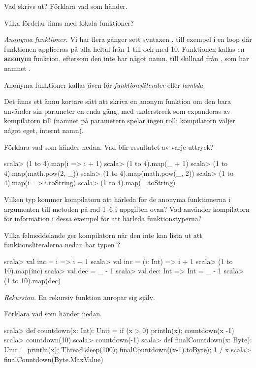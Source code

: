 \Subtask Vad skrivs ut? Förklara vad som händer.

\Subtask\Pen Vilka fördelar finns med lokala funktioner?


\Task \emph{Anonyma funktioner.} Vi har flera gånger sett syntaxen , till exempel i en loop  där funktionen  appliceras på alla heltal från 1 till och med 10. Funktionen  kallas en \textbf{anonym} funktion, eftersom den inte har något namn, till skillnad från , som har namnet .

Anonyma funktioner kallas även för \emph{funktionsliteraler} eller \emph{lambda}.

Det finns ett ännu kortare sätt att skriva en anonym funktion om den bara använder sin parameter en enda gång, med understreck  som expanderas av kompilatorn till  (namnet på parametern spelar ingen roll; kompilatorn väljer något eget, internt namn).

\Subtask Förklara vad som händer nedan. Vad blir resultatet av varje uttryck?

\begin{REPL}
scala> (1 to 4).map(i => i + 1)
scala> (1 to 4).map(_ + 1)
scala> (1 to 4).map(math.pow(2, _))
scala> (1 to 4).map(math.pow(_, 2))
scala> (1 to 4).map(i => i.toString)
scala> (1 to 4).map(_.toString)
\end{REPL}

\Subtask\Pen Vilken typ kommer kompilatorn att härleda för de anonyma funktionerna i argumenten till metoden  på rad 1--6 i uppgiften ovan? Vad använder kompilatorn för information i dessa exempel för att härleda funktionstyperna?

\Subtask\Pen Vilka felmeddelande ger kompilatorn när den inte kan lista ut att funktionsliteralerna nedan har typen ?

\begin{REPL}
scala> val inc = i => i + 1
scala> val inc = (i: Int) => i + 1
scala> (1 to 10).map(inc)
scala> val dec = _ - 1
scala> val dec: Int => Int = _ - 1
scala> (1 to 10).map(dec)
\end{REPL}



\Task \emph{Rekursion.} En rekursiv funktion anropar sig själv.

\Subtask Förklara vad som händer nedan.

\begin{REPL}
scala> def countdown(x: Int): Unit = if (x > 0) {println(x); countdown(x -1)}
scala> countdown(10)
scala> countdown(-1)
scala> def finalCountdown(x: Byte): Unit =
         {println(x); Thread.sleep(100); finalCountdown((x-1).toByte); 1 / x}
scala> finalCountdown(Byte.MaxValue)
\end{REPL}

